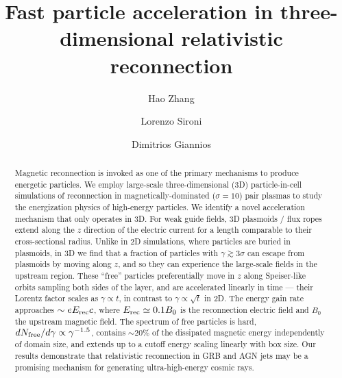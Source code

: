 \documentclass[twocolumn,twocolappendix]{aastex63}
\begin{document}
\title{Fast particle acceleration in three-dimensional relativistic reconnection}



\author{Hao Zhang}

\author{Lorenzo Sironi}

\author{Dimitrios Giannios}


\begin{abstract}
Magnetic reconnection is invoked as one of the primary mechanisms to produce energetic particles. %
We employ large-scale three-dimensional (3D) particle-in-cell simulations of reconnection in magnetically-dominated ($\sigma=10$) pair plasmas to study the energization physics of high-energy particles. We identify a novel acceleration mechanism that only operates in 3D. For weak guide fields, 3D plasmoids / flux ropes extend along the $z$ direction of the electric current for a length comparable to their cross-sectional radius. Unlike in 2D simulations, where particles are buried in plasmoids, in 3D we find that a fraction of particles with $\gamma\gtrsim 3\sigma$ can escape from plasmoids by moving along $z$, and so they can experience the large-scale fields in the upstream region. These ``free'' particles preferentially move in $z$ along Speiser-like orbits sampling both sides of the layer, and are accelerated linearly in time --- their Lorentz factor scales as $\gamma\propto t$, in contrast to $\gamma\propto \sqrt{t}$ in 2D. The energy gain rate approaches $\sim eE_{\rm rec}c$, where $E_{\rm rec}\simeq 0.1 B_0$ is the reconnection electric field and $B_0$ the upstream magnetic field. The spectrum of free particles is hard, $dN_{\rm free}/d\gamma\propto \gamma^{-1.5}$,  contains $\sim 20\%$ of the dissipated magnetic energy independently of domain size, and extends up to a cutoff energy scaling linearly with box size. Our results demonstrate that relativistic reconnection in GRB and AGN jets may be a promising mechanism for generating ultra-high-energy cosmic rays.

\end{abstract}
\end{document}
